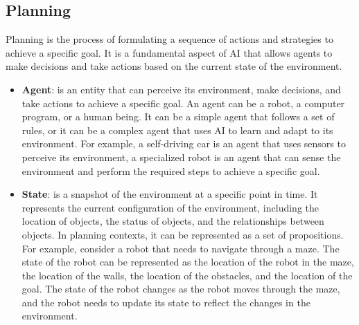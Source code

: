 \subsection{Planning}
Planning is the process of formulating a sequence of actions and strategies to achieve a specific goal.
It is a fundamental aspect of \ac{AI} that allows agents to make decisions and take actions based on the current state of the environment.
\begin{itemize}
    \item \textbf{Agent}: is an entity that can perceive its environment, make decisions, and take actions to achieve a specific goal. An agent can be a robot, a computer program, or a human being. It can be a simple agent that follows a set of rules, or it can be a complex agent that uses \ac{AI} to learn and adapt to its environment. For example, a self-driving car is an agent that uses sensors to perceive its environment, a specialized robot is an agent that can sense the environment and perform the required steps to achieve a specific goal.

    \item \textbf{State}: is a snapshot of the environment at a specific point in time. It represents the current configuration of the environment, including the location of objects, the status of objects, and the relationships between objects. In planning contexts, it can be represented as a set of propositions. For example, consider a robot that needs to navigate through a maze. The state of the robot can be represented as the location of the robot in the maze, the location of the walls, the location of the obstacles, and the location of the goal. The state of the robot changes as the robot moves through the maze, and the robot needs to update its state to reflect the changes in the environment.


\end{itemize}
